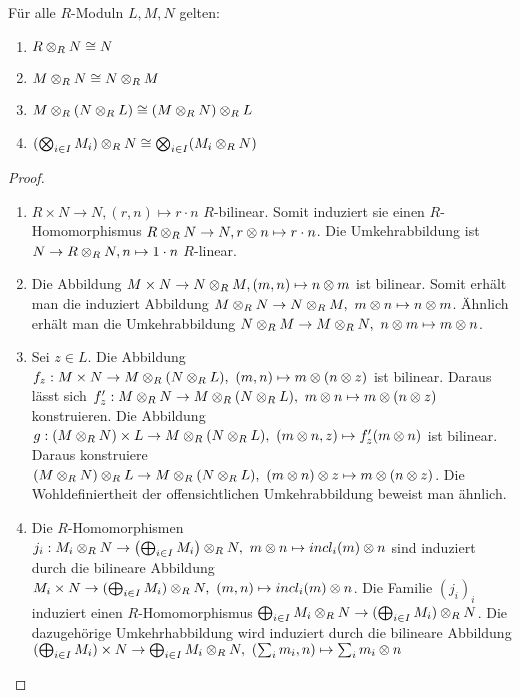 \documentclass[../main.tex]{subfiles}
\begin{document}
\begin{lemma}
    Für alle $R$-Moduln $L,M,N$ gelten:
    \begin{enumerate}[label=(\roman*)]
        \item $R\otimes_R N \cong N$
        \item $M\otimes_R N \cong N\otimes_R M$
        \item $M\otimes_R (N\otimes_R L) \cong (M\otimes_R N)\otimes_R L$
        \item $(\bigotimes_{i\in I} M_i)\otimes_R N \cong \bigotimes_{i\in I} (M_i\otimes_R N)$
    \end{enumerate}
\end{lemma}

\begin{proof}$ $
    \begin{enumerate}[label=(\roman*)]
        \item
        $R\times N \rightarrow N, (r,n)\mapsto r\cdot n$ $R$-bilinear.
        Somit induziert sie einen $R$-Homomorphismus $R\otimes_R N\rightarrow N, r\otimes n\mapsto r\cdot n$.
        Die Umkehrabbildung ist $N\rightarrow R\otimes_R N, n\mapsto 1\cdot n$ $R$-linear.
        \item 
        Die Abbildung $M\times N\rightarrow N\otimes_R M, (m,n)\mapsto n\otimes m$ ist bilinear. Somit erhält man die induziert Abbildung $M\otimes_R N \rightarrow N\otimes_R M,\ m\otimes n\mapsto n\otimes m$.
        Ähnlich erhält man die Umkehrabbildung $N\otimes_R M \rightarrow M\otimes_R N,\ n\otimes m \mapsto m\otimes n$.
        \item 
        Sei $z\in L$. Die Abbildung $f_z:M\times N\rightarrow M\otimes_R(N\otimes_R L),\ (m,n) \mapsto m\otimes (n\otimes z)$ ist bilinear.
        Daraus lässt sich $f'_z:M\otimes_R N \rightarrow M \otimes_R(N\otimes_R L),\ m\otimes n\mapsto m\otimes(n\otimes z)$ konstruieren.
        Die Abbildung $g:(M\otimes_R N)\times L \rightarrow M \otimes_R ( N\otimes_R L),\ (m\otimes n,z) \mapsto f'_z (m\otimes n)$ ist bilinear.
        Daraus konstruiere $(M\otimes_R N)\otimes_R L \rightarrow M \otimes_R (N\otimes_R L),\ (m\otimes n)\otimes z \mapsto m\otimes (n\otimes z)$.
        Die Wohldefiniertheit der offensichtlichen Umkehrabbildung beweist man ähnlich.
        \item 
        Die $R$-Homomorphismen $j_i:M_i\otimes_R N \rightarrow\left(\bigoplus_{i\in I} M_i\right) \otimes_R N,\ m\otimes n\mapsto incl_i(m)\otimes n$ sind induziert durch die bilineare Abbildung $M_i\times N \rightarrow (\bigoplus_{i\in I} M_i) \otimes_R N,\ (m,n) \mapsto incl_i(m) \otimes n$.
        Die Familie $(j_i)_i$ induziert einen $R$-Homomorphismus $\bigoplus_{i\in I} M_i\otimes_R N \rightarrow (\bigoplus_{i\in I} M_i) \otimes_R N$.
        Die dazugehörige Umkehrhabbildung wird induziert durch die bilineare Abbildung $(\bigoplus_{i\in I} M_i) \times N \rightarrow \bigoplus_{i\in I} M_i \otimes_R N,\ (\sum_i m_i,n)\mapsto \sum_i m_i\otimes n$ 
        
    \end{enumerate}
\end{proof}
\end{document}
